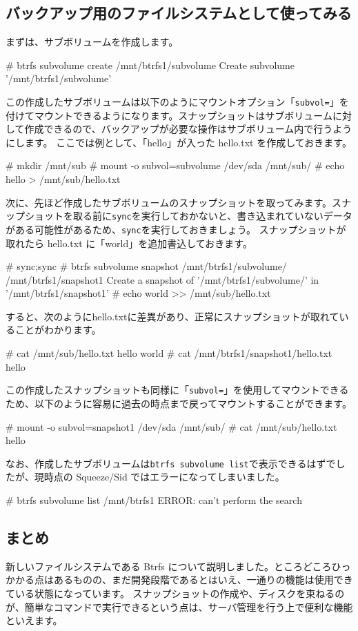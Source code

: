 \documentclass[mingoth,a4paper]{jsarticle}
\begin{document}
\subsection{バックアップ用のファイルシステムとして使ってみる}
まずは、サブボリュームを作成します。
\begin{commandline}
# btrfs subvolume create /mnt/btrfs1/subvolume
Create subvolume '/mnt/btrfs1/subvolume'
\end{commandline}
この作成したサブボリュームは以下のようにマウントオプション「\texttt{subvol=}」を付けてマウントできるようになります。スナップショットはサブボリュームに対して作成できるので、バックアップが必要な操作はサブボリューム内で行うようにします。
ここでは例として、「hello」が入った hello.txt を作成しておきます。
\begin{commandline}
# mkdir /mnt/sub
# mount -o subvol=subvolume /dev/sda /mnt/sub/
# echo hello > /mnt/sub/hello.txt
\end{commandline}
次に、先ほど作成したサブボリュームのスナップショットを取ってみます。スナップショットを取る前に\texttt{sync}を実行しておかないと、書き込まれていないデータがある可能性があるため、\texttt{sync}を実行しておきましょう。
スナップショットが取れたら hello.txt に「world」を追加書込しておきます。
\begin{commandline}
# sync;sync
# btrfs subvolume snapshot /mnt/btrfs1/subvolume/ /mnt/btrfs1/snapshot1
Create a snapshot of '/mnt/btrfs1/subvolume/' in '/mnt/btrfs1/snapshot1'
# echo world >> /mnt/sub/hello.txt
\end{commandline}
すると、次のようにhello.txtに差異があり、正常にスナップショットが取れていることがわかります。
\begin{commandline}
# cat /mnt/sub/hello.txt
hello
world
# cat /mnt/btrfs1/snapshot1/hello.txt
hello
\end{commandline}
この作成したスナップショットも同様に「\texttt{subvol=}」を使用してマウントできるため、以下のように容易に過去の時点まで戻ってマウントすることができます。
\begin{commandline}
# mount -o subvol=snapshot1 /dev/sda /mnt/sub/
# cat /mnt/sub/hello.txt
hello
\end{commandline}
なお、作成したサブボリュームは\texttt{btrfs subvolume list}で表示できるはずでしたが、現時点の Squeeze/Sid ではエラーになってしまいました。
\begin{commandline}
# btrfs subvolume list /mnt/btrfs1
ERROR: can't perform the search
\end{commandline}

\subsection{まとめ}
新しいファイルシステムである Btrfs について説明しました。ところどころひっかかる点はあるものの、まだ開発段階であるとはいえ、一通りの機能は使用できている状態になっています。
スナップショットの作成や、ディスクを束ねるのが、簡単なコマンドで実行できるという点は、サーバ管理を行う上で便利な機能といえます。
\end{document}
